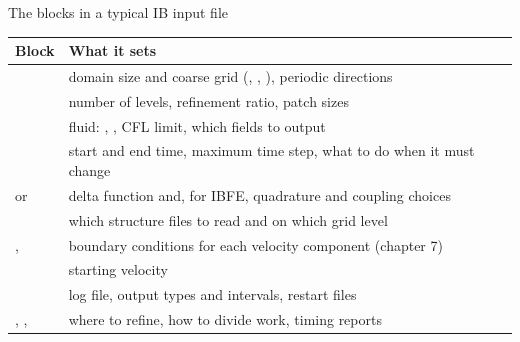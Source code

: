 \documentclass[aspectratio=169,11pt]{beamer}
\begin{document}
\begin{frame}{The blocks in a typical IB input file}
\footnotesize
\begin{tabular}{@{}L{0.42\textwidth}L{0.54\textwidth}@{}}
\toprule
Block & What it sets \\
\midrule
{} & domain size and coarse grid (, , ), periodic directions \\
 & number of levels, refinement ratio, patch sizes \\
 & fluid: , , CFL limit, which fields to output \\
 & start and end time, maximum time step, what to do when it must change \\
 or  & delta function and, for IBFE, quadrature and coupling choices \\
 & which structure files to read and on which grid level \\
,  & boundary conditions for each velocity component (chapter 7) \\
 & starting velocity \\
 & log file, output types and intervals, restart files \\
, ,  & where to refine, how to divide work, timing reports \\
\bottomrule
\end{tabular}
\end{frame}
\end{document}
